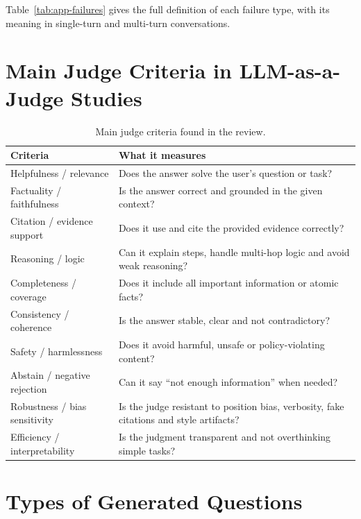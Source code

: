 \documentclass[11pt]{article}
\begin{document}
Table~\ref{tab:app-failures} gives the full definition of each failure type, with its meaning in single-turn and multi-turn conversations.

\section{Main Judge Criteria in LLM-as-a-Judge Studies}
\label{app:criteria}

\begin{table}[H]
\centering\small
\begin{tabularx}{\columnwidth}{@{}p{2.6cm} L@{}}
\toprule
\textbf{Criteria} & \textbf{What it measures} \\
\midrule
Helpfulness / relevance & Does the answer solve the user's question or task? \\
Factuality / faithfulness & Is the answer correct and grounded in the given context? \\
Citation / evidence support & Does it use and cite the provided evidence correctly? \\
Reasoning / logic & Can it explain steps, handle multi-hop logic and avoid weak reasoning? \\
Completeness / coverage & Does it include all important information or atomic facts? \\
Consistency / coherence & Is the answer stable, clear and not contradictory? \\
Safety / harmlessness & Does it avoid harmful, unsafe or policy-violating content? \\
Abstain / negative rejection & Can it say ``not enough information'' when needed? \\
Robustness / bias sensitivity & Is the judge resistant to position bias, verbosity, fake citations and style artifacts? \\
Efficiency / interpretability & Is the judgment transparent and not overthinking simple tasks? \\
\bottomrule
\end{tabularx}
\caption{Main judge criteria found in the review.}
\end{table}

\section{Types of Generated Questions}
\label{app:qtypes}
\end{document}
